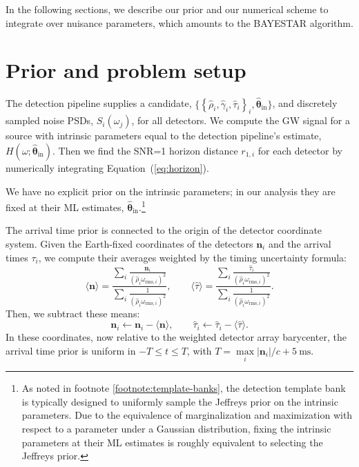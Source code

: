 \documentclass[amsmath,amssymb,aps,prx,reprint,nopreprintnumbers,nofootinbib]{revtex4-1}
\begin{document}
In the following sections, we describe our prior and our numerical scheme to integrate over nuisance parameters, which amounts to the \ac{BAYESTAR} algorithm.

\section{Prior and problem setup}
\label{sec:prior}

The detection pipeline supplies a candidate, $\{\left\{ \hat\rho_i, \hat\gamma_i, \hat\tau_i \right\}_i, \hat{\bm\theta}_\mathrm{in}\}$, and discretely sampled noise \acp{PSD}, $S_i(\omega_j)$, for all detectors. We compute the \ac{GW} signal for a source with intrinsic parameters equal to the detection pipeline's estimate, $H(\omega; \hat{\bm\theta}_\mathrm{in})$.
Then we find the \ac{SNR}=1 horizon distance $r_{1,i}$ for each detector by numerically integrating Equation~(\ref{eq:horizon}).

We have no explicit prior on the intrinsic parameters; in our analysis they are fixed at their \ac{ML} estimates, $\hat{\bm\theta}_\mathrm{in}$.\footnote{As noted in footnote \ref{footnote:template-banks}, the detection template bank is typically designed to uniformly sample the Jeffreys prior on the intrinsic parameters. Due to the equivalence of marginalization and maximization with respect to a parameter under a Gaussian distribution, fixing the intrinsic parameters at their \ac{ML} estimates is roughly equivalent to selecting the Jeffreys prior.}

The arrival time prior is connected to the origin of the detector coordinate system. Given the Earth\nobreakdashes-fixed coordinates of the detectors $\mathbf{n}_i$ and the arrival times $\tau_i$, we compute their averages weighted by the timing uncertainty formula:
%
\begin{equation*}
    \langle \mathbf{n} \rangle = \frac{
        \displaystyle
        \sum_i \frac{\mathbf{n}_i}
            {\left(\hat\rho_i \omega_{\mathrm{rms},i}\right)^2}
    }{
        \displaystyle
        \sum_i \frac{1}{\left(\hat\rho_i \omega_{\mathrm{rms},i}\right)^2}
    },
    \qquad
    \langle \hat\tau \rangle = \frac{
        \displaystyle
        \sum_i \frac{\hat\tau_i}
            {\left(\hat\rho_i \omega_{\mathrm{rms},i}\right)^2}
    }{
        \displaystyle
        \sum_i \frac{1}{\left(\hat\rho_i \omega_{\mathrm{rms},i}\right)^2}
    }.
\end{equation*}
%
Then, we subtract these means:
%
\begin{equation*}
    \mathbf{n}_i \leftarrow \mathbf{n}_i - \langle \mathbf{n} \rangle,
    \qquad
    \hat\tau_i \leftarrow \hat\tau_i - \langle \hat\tau \rangle.
\end{equation*}
%
In these coordinates, now relative to the weighted detector array barycenter, the arrival time prior is uniform in $-T \leq t \leq T$, with $T = \max\limits_i |\mathbf{n}_i| / c + 5~\textrm{ms}$.
\end{document}
